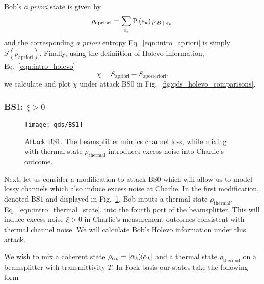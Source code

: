 \noindent Bob's \emph{a priori} state is given by
\begin{equation}\label{eqn:qds_aprioristate}
\rho_{\text{apriori}} = \sum_{e_k} \text{P}\left(e_k\right) \rho_{\left. B \; \middle| \; e_k\right.}
\end{equation}
and the corresponding \emph{a priori} entropy Eq.~\ref{eqn:intro_apriori} is simply $S\left(\rho_{\text{apriori}}\right)$.%
Finally, using the definiition of Holevo information, Eq.~\ref{eqn:intro_holevo}
\begin{equation}
\chi = S_{\text{apriori}} - S_{\text{aposteriori}}.
\end{equation}
we calculate and plot $\chi$ under attack BS$0$ in Fig.~\ref{fig:qds_holevo_comparisons}. 

\subsubsection{BS$1$: $\xi > 0$}\label{sec:qds_bs1}
\begin{figure}[htp]
\centering
\texttt{[image: qds/BS1]}
\caption{\label{fig:bs1_attack} Attack BS$1$. The beamsplitter mimics channel loss, while mixing with thermal state $\rho_{\text{thermal}}$ introduces excess noise into Charlie's outcome.}
\end{figure}
Next, let us consider a modification to attack BS$0$ which will allow us to model lossy channels which also induce excess noise at Charlie. In the first modification, denoted BS$1$ and displayed in Fig.~\ref{fig:bs1_attack}, Bob inputs a thermal state $\rho_{\text{thermal}}$, Eq.~\ref{eqn:intro_thermal_state}, into the fourth port of the beamsplitter. %
This will induce excess noise $\xi > 0$ in Charlie's measurement outcomes consistent with thermal channel noise. We will calculate Bob's Holevo information under this attack.

We wish to mix a coherent state $\rho_{\alpha_k} = \dyad{\alpha_k}$ and a thermal state $\rho_{\text{thermal}}$ on a beamsplitter with transmittivity $T$. In Fock basis our states take the following form

